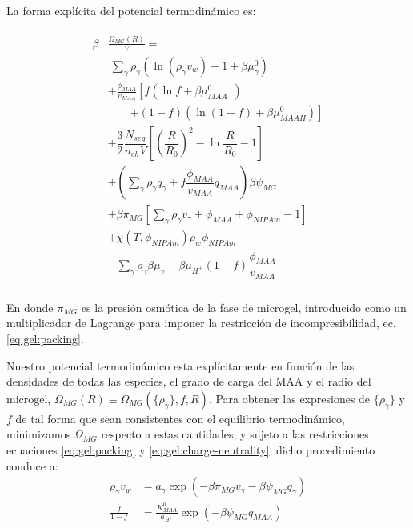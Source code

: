 La forma expl\'icita del potencial termodin\'amico es:




%
\begin{align}
\begin{aligned}
\beta&\frac{\Omega_{MG}(R)}{V}=\\& ~ \sum_{\gamma} \rho_\gamma\left(\ln\left(\rho_\gamma v_w\right) -1 + \beta\mu^0_\gamma\right) \\
& + \frac{\phi_{MAA}}{v_{MAA}} \left[f(\ln f+ \beta\mu^0_{MAA^-})\right.\\
&\qquad\left.+(1-f)(\ln (1-f)+\beta\mu^0_{MAAH})\right] \\
%
& + \dfrac{3}{2}\dfrac{N_{seg}}{n_{ch} V}\left[\left(\dfrac{R}{R_0}\right)^2 - \ln\dfrac{R}{R_0} -1\right] \\
%
& +  \left(\sum_{\gamma } {\rho_\gamma q_\gamma + f\dfrac{\phi_{MAA}}{v_{MAA}}q_{MAA}}\right)\beta\psi_{MG}\\
%
& +\beta\pi_{MG} \left[ \sum_{\gamma } \rho_\gamma v_\gamma  + \phi_{MAA} + \phi_{NIPAm} -1 \right] \\
%
& + \chi (T, \phi_{NIPAm})\rho_w \phi_{NIPAm} \\
%
& -\sum_{\gamma }{\rho_\gamma\beta\mu_\gamma}
 -\beta\mu_{H^+}(1-f)\dfrac{\phi_{MAA}}{v_{MAA}}\\
%
%
\end{aligned}
\label{eq:gel:free-energy}
\end{align}




\noindent En donde $\pi_{MG}$ es la presi\'on osm\'otica de la fase de microgel, introducido como un multiplicador de Lagrange para imponer la restricci\'on de incompresibilidad, ec. \ref{eq:gel:packing}.


Nuestro potencial termodin\'amico esta expl\'icitamente en funci\'on de las densidades de todas las especies, el grado de carga del MAA y el radio del microgel, $\Omega_{MG}(R)\equiv\Omega_{MG}(\{\rho_\gamma\},f,R)$.
Para obtener las expresiones de $\{\rho_\gamma\}$ y $f$ de tal forma que sean consistentes con el equilibrio termodin\'amico, minimizamos $\Omega_{MG}$ respecto a estas cantidades, y  sujeto a las restricciones ecuaciones  \ref{eq:gel:packing} y  \ref{eq:gel:charge-neutrality}; dicho procedimiento conduce a: 
%
%
\begin{align}
\rho_\gamma v_w &= a_\gamma \exp(-\beta\pi_{MG}v_\gamma -\beta\psi_{MG}q_{\gamma})\\
\frac{f}{1-f}&= \frac{K^0_{MAA}}{a_{H^+}}\exp(-\beta\psi_{MG}q_{MAA})\label{eq:gel:fcharge}
\end{align}

